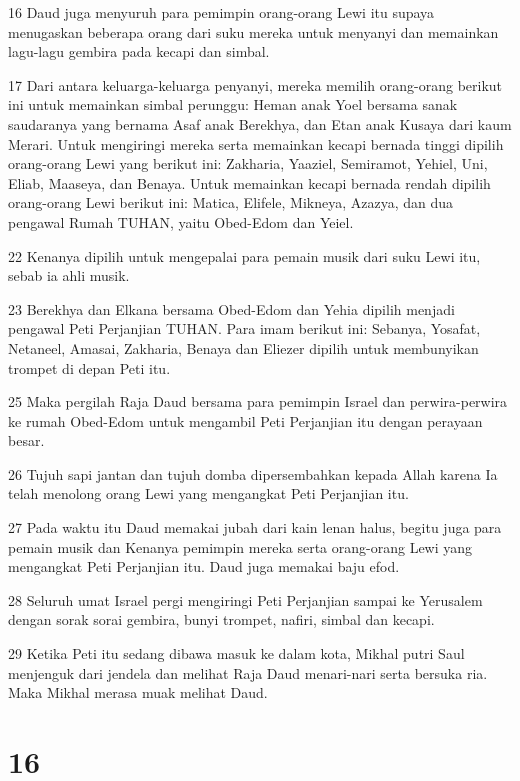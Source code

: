 \par 16 Daud juga menyuruh para pemimpin orang-orang Lewi itu supaya menugaskan beberapa orang dari suku mereka untuk menyanyi dan memainkan lagu-lagu gembira pada kecapi dan simbal.
\par 17 Dari antara keluarga-keluarga penyanyi, mereka memilih orang-orang berikut ini untuk memainkan simbal perunggu: Heman anak Yoel bersama sanak saudaranya yang bernama Asaf anak Berekhya, dan Etan anak Kusaya dari kaum Merari. Untuk mengiringi mereka serta memainkan kecapi bernada tinggi dipilih orang-orang Lewi yang berikut ini: Zakharia, Yaaziel, Semiramot, Yehiel, Uni, Eliab, Maaseya, dan Benaya. Untuk memainkan kecapi bernada rendah dipilih orang-orang Lewi berikut ini: Matica, Elifele, Mikneya, Azazya, dan dua pengawal Rumah TUHAN, yaitu Obed-Edom dan Yeiel.
\par 22 Kenanya dipilih untuk mengepalai para pemain musik dari suku Lewi itu, sebab ia ahli musik.
\par 23 Berekhya dan Elkana bersama Obed-Edom dan Yehia dipilih menjadi pengawal Peti Perjanjian TUHAN. Para imam berikut ini: Sebanya, Yosafat, Netaneel, Amasai, Zakharia, Benaya dan Eliezer dipilih untuk membunyikan trompet di depan Peti itu.
\par 25 Maka pergilah Raja Daud bersama para pemimpin Israel dan perwira-perwira ke rumah Obed-Edom untuk mengambil Peti Perjanjian itu dengan perayaan besar.
\par 26 Tujuh sapi jantan dan tujuh domba dipersembahkan kepada Allah karena Ia telah menolong orang Lewi yang mengangkat Peti Perjanjian itu.
\par 27 Pada waktu itu Daud memakai jubah dari kain lenan halus, begitu juga para pemain musik dan Kenanya pemimpin mereka serta orang-orang Lewi yang mengangkat Peti Perjanjian itu. Daud juga memakai baju efod.
\par 28 Seluruh umat Israel pergi mengiringi Peti Perjanjian sampai ke Yerusalem dengan sorak sorai gembira, bunyi trompet, nafiri, simbal dan kecapi.
\par 29 Ketika Peti itu sedang dibawa masuk ke dalam kota, Mikhal putri Saul menjenguk dari jendela dan melihat Raja Daud menari-nari serta bersuka ria. Maka Mikhal merasa muak melihat Daud.

\chapter{16}


